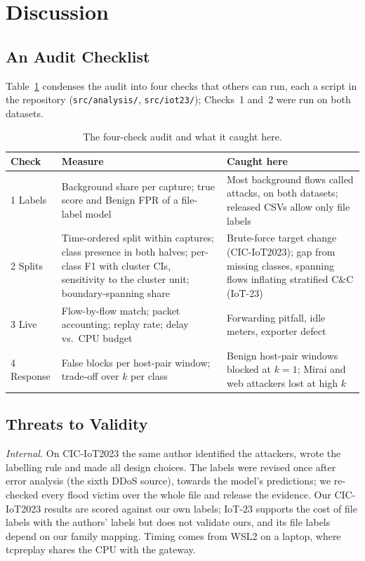 \section{Discussion}\label{sec:discussion}

\subsection{An Audit Checklist}\label{sec:checklist}

Table~\ref{tab:checklist} condenses the audit into four checks that others can run, each a script in the repository (\nolinkurl{src/analysis/}, \nolinkurl{src/iot23/}); Checks~1 and~2 were run on both datasets.

\begin{table}[t]
\centering
\caption{The four-check audit and what it caught here.}
\label{tab:checklist}
\footnotesize
\setlength{\tabcolsep}{3pt}
\begin{tabular}{p{1.0cm}p{3.5cm}p{3.6cm}}
\hline
Check & Measure & Caught here \\
\hline
1 Labels & Background share per capture; true score and Benign FPR of a file-label model & Most background flows called attacks, on both datasets; released CSVs allow only file labels \\
2 Splits & Time-ordered split within captures; class presence in both halves; per-class F1 with cluster CIs, sensitivity to the cluster unit; boundary-spanning share & Brute-force target change (CIC-IoT2023); gap from missing classes, spanning flows inflating stratified C\&C (IoT-23) \\
3 Live & Flow-by-flow match; packet accounting; replay rate; delay vs.\ CPU budget & Forwarding pitfall, idle meters, exporter defect \\
4 Response & False blocks per host-pair window; trade-off over $k$ per class & Benign host-pair windows blocked at $k=1$; Mirai and web attackers lost at high $k$ \\
\hline
\end{tabular}
\end{table}

\subsection{Threats to Validity}\label{sec:threats}

\emph{Internal.} On CIC-IoT2023 the same author identified the attackers, wrote the labelling rule and made all design choices. The labels were revised once after error analysis (the sixth DDoS source), towards the model's predictions; we re-checked every flood victim over the whole file and release the evidence. Our CIC-IoT2023 results are scored against our own labels; IoT-23 supports the cost of file labels with the authors' labels but does not validate ours, and its file labels depend on our family mapping. Timing comes from WSL2 on a laptop, where tcpreplay shares the CPU with the gateway.

